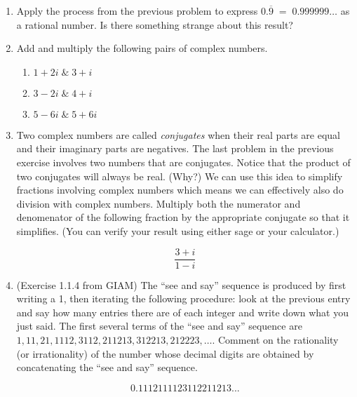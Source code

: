 \documentclass{amsart}
\begin{document}
\begin{enumerate}
\newpage

\item Apply the process from the previous problem to express $0.\overline{9} \; = \; 0.999999\ldots$ as a rational number.  Is there something strange about this result?

\vfill

\vfill

\item Add and multiply the following pairs of complex numbers.

\begin{enumerate}
\item \rule{0pt}{36pt} $ 1 + 2i \; \& \; 3 + i $
\item \rule{0pt}{36pt} $ 3 - 2i \; \& \; 4 + i $
\item \rule{0pt}{36pt} $ 5 - 6i \; \& \; 5 + 6i $
\end{enumerate}

\vfill

\newpage

\item Two complex numbers are called {\em conjugates} when their real parts are equal and their imaginary parts are negatives.  The last problem in the previous exercise involves two numbers that are conjugates.  Notice that the product of two conjugates will always be real.  (Why?) We can use this idea to simplify fractions involving complex numbers which means we can effectively also do division with complex numbers.  Multiply both the numerator and denomenator of the following fraction by the appropriate conjugate so that it simplifies.  (You can verify your result using either sage or your calculator.)

\[ \frac{3+i}{1-i} \]

\vfill

\item (Exercise 1.1.4 from GIAM) The ``see and say'' sequence is produced by first writing a 1, 
then iterating the following procedure:  look at the previous entry 
and say how many entries there are of each integer and write down what 
you just said.  The first several terms of the ``see and say'' sequence 
are $1, 11, 21, 1112, 3112, 211213, 312213, 212223, \ldots$.  Comment on the
rationality (or irrationality) of the number whose decimal digits are obtained 
by concatenating the ``see and say'' sequence.

\[ 0.1112111123112211213... \]

\vfill

\newpage



\end{enumerate}
\end{document}
